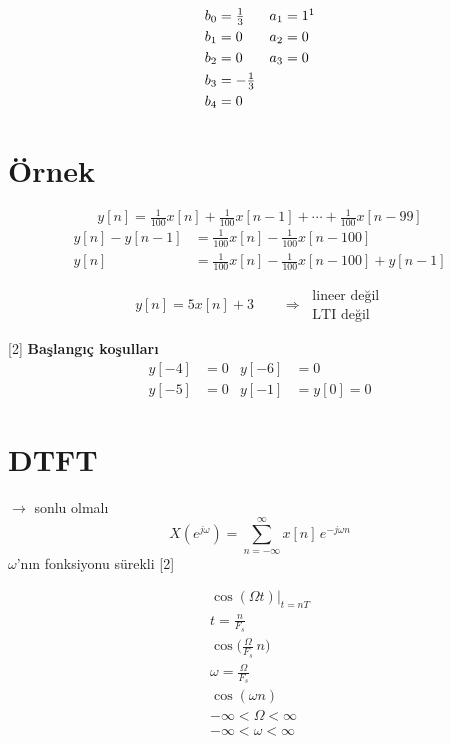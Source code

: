 \documentclass[11pt,a4paper]{article}
\begin{document}
\begin{align*}
b_0 &= \tfrac{1}{3} & a_1 &= 1\footnotemark\\
b_1 &= 0 & a_2 &= 0\\
b_2 &= 0 & a_3 &= 0\\
b_3 &= -\tfrac{1}{3} & &\\
b_4 &= 0 & &
\end{align*}

\section{Örnek}
\[ y[n]=\tfrac{1}{100}x[n]+\tfrac{1}{100}x[n-1]+\cdots+\tfrac{1}{100}x[n-99] \]
\begin{align*}
y[n]-y[n-1] &= \tfrac{1}{100}x[n]-\tfrac{1}{100}x[n-100]\\
y[n] &= \tfrac{1}{100}x[n]-\tfrac{1}{100}x[n-100]+y[n-1]
\end{align*}

\[ y[n]=5x[n]+3 \qquad \Rightarrow\ \begin{array}{l}\text{lineer değil}\\ \text{LTI değil}\end{array} \]

[2]
\textbf{Başlangıç koşulları}
\begin{align*}
y[-4] &= 0 & y[-6] &= 0\\
y[-5] &= 0 & y[-1] &= y[0] = 0
\end{align*}

\section{DTFT}
$\rightarrow$ sonlu olmalı
\[ X(e^{j\omega})=\sum_{n=-\infty}^{\infty} x[n]\,e^{-j\omega n} \]
$\omega$'nın fonksiyonu sürekli
[2]

\begin{gather*}
\cos(\Omega t)\Big|_{t=nT}\\
t=\frac{n}{F_s}\\
\cos\Big(\frac{\Omega}{F_s}\,n\Big)\\
\omega=\frac{\Omega}{F_s}\\
\cos(\omega n)\\
-\infty<\Omega<\infty\\
-\infty<\omega<\infty
\end{gather*}
\end{document}
